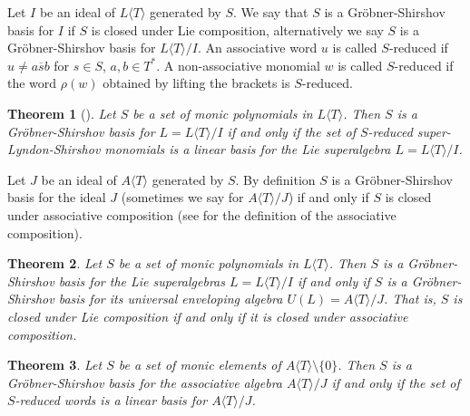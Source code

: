 \documentclass[12pt, reqno]{amsart}
\newtheorem{theorem}{Theorem}[section]
\theoremstyle{remark}
\theoremstyle{definition}
\numberwithin{equation}{section}
\begin{document}
Let $I$ be an ideal of  $L \langle T \rangle$ generated by $S$. We say that $S$ is a Gr\"obner-Shirshov basis for $I$ if $S$ is closed under Lie composition,  alternatively we say $S$ is a Gr\"obner-Shirshov basis for $L \langle T \rangle/ I$.  
An associative word $u$ is called $S$-reduced if $ u \not= a\overline{s} b$ for $s \in S$, $a,b \in T^*$.
A non-associative monomial $w$ is  called $S$-reduced if the word $\rho(w)$ obtained by lifting the brackets is $S$-reduced. 

\begin{theorem}[\cite{B-K-L-M}] \label{linear-basis} Let $S$ be a set of monic polynomials in $L \langle T \rangle$. 
Then $S$ is a Gr\"obner-Shirshov basis for  $L = L \langle T \rangle/ I$ if and only if
the set of $S$-reduced super-Lyndon-Shirshov monomials is a linear basis for the Lie superalgebra  $L = L \langle T \rangle / I$.
\end{theorem}


Let $J$ be an ideal of $A \langle T \rangle$ generated by  $S$. By definition $S$ is a  Gr\"obner-Shirshov basis for the ideal $J$ (sometimes we say for $A \langle T \rangle/ J$) if and only if $S$ is closed under associative composition (see \cite{B-K-L-M} for the definition of the associative composition).

\begin{theorem} \cite[Thm. 2.8]{B-K-L-M}   \label{asss}  Let $S$ be a set of monic polynomials in $L \langle T \rangle$. Then $S$ is a Gr\"obner-Shirshov basis for the Lie superalgebras $L = L \langle T \rangle/ I$ if and only if
$S$ is a Gr\"obner-Shirshov basis for its universal enveloping algebra $U(L) = A \langle T \rangle / J$. That is, $S$ is closed  under Lie composition if and only if it is closed under associative composition.
\end{theorem}  

\begin{theorem} \cite{B-K-L-M} \label{asss2} Let $S$ be a set of monic elements of $A \langle T \rangle \setminus \{ 0 \}$. Then $S$ is a Gr\"obner-Shirshov basis for the associative algebra $A \langle T \rangle/ J$ if and only if the set of $S$-reduced words is a linear basis for $A \langle T \rangle/ J$.
\end{theorem}
\end{document}
